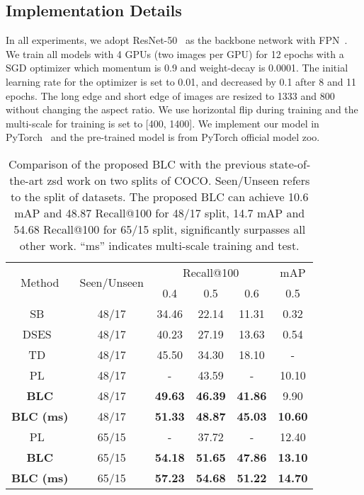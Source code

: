\documentclass[runningheads]{llncs}
\begin{document}
\subsection{Implementation Details}
In all experiments, we adopt ResNet-50~\cite{he2016deep} as the backbone network with FPN~\cite{lin2017feature}. We train all models with 4 GPUs (two images per GPU) for 12 epochs with a SGD optimizer which momentum is 0.9 and weight-decay is 0.0001. The initial learning rate for the optimizer is set to 0.01, and decreased by 0.1 after 8 and 11 epochs. The long edge and short edge of images are resized to 1333 and 800 without changing the aspect ratio. We use horizontal flip during training and the multi-scale for training is set to [400, 1400]. We implement our model in PyTorch~\cite{paszke2017automatic} and the pre-trained model is from PyTorch official model zoo.
\setlength{\tabcolsep}{6pt}
\begin{table}[tbp]
\begin{center}
\caption{Comparison of the proposed BLC with the previous state-of-the-art zsd work on two splits of COCO. Seen/Unseen refers to the split of datasets. The proposed BLC can achieve 10.6 mAP and 48.87 Recall@100 for 48/17 split, 14.7 mAP and 54.68 Recall@100 for 65/15 split, significantly surpasses all other work. “ms” indicates multi-scale training and test.}
\label{table:benchmark result}
\begin{tabular}{cccccc}
\toprule
\multirow{2}{*}{Method} & \multirow{2}{*}{Seen/Unseen} & \multicolumn{3}{c}{Recall@100} & mAP \\
\cmidrule(lr){3-5} \cmidrule(lr){6-6}
~ & ~ & 0.4 & 0.5 & 0.6 & 0.5 \\
\midrule
SB~\cite{bansal2018zero} & 48/17 & 34.46 & 22.14 & 11.31 & 0.32 \\
DSES~\cite{bansal2018zero} & 48/17 & 40.23 & 27.19 & 13.63 & 0.54 \\
TD~\cite{li2019zero} & 48/17 & 45.50 & 34.30 & 18.10 & - \\
PL~\cite{rahman2020improved} & 48/17 & - & 43.59 & - & 10.10 \\
\hline
\textbf{BLC } & 48/17 &  \textbf{49.63} &  \textbf{46.39} &  \textbf{41.86} & 9.90 \\
\textbf{BLC (ms)} & 48/17 &  \textbf{51.33} & \textbf{48.87} & \textbf{45.03} & \textbf{10.60} \\
\bottomrule
PL~\cite{rahman2020improved} & 65/15 & - & 37.72 & - & 12.40  \\
\hline
\textbf{BLC} & 65/15 & \textbf{54.18} & \textbf{51.65} & \textbf{47.86} & \textbf{13.10} \\
\textbf{BLC (ms)} & 65/15 &  \textbf{57.23} & \textbf{54.68} & \textbf{51.22} & \textbf{14.70} \\
\bottomrule
\end{tabular}
\end{center}
\end{table}
\setlength{\tabcolsep}{1.4pt}
\end{document}
